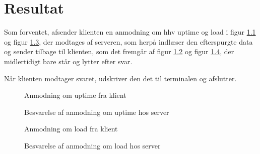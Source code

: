 \chapter{Resultat}

Som forventet, afsender klienten en anmodning om hhv uptime og load i figur \ref{fig:uptimeclient} og figur \ref{fig:loadclient}, der modtages af serveren, som herpå indlæser den efterspurgte data og sender tilbage til klienten, som det fremgår af figur \ref{fig:uptimeserver} og figur \ref{fig:loadserver}, der midlertidigt bare står og lytter efter svar.

Når klienten modtager svaret, udskriver den det til terminalen og afslutter. 

\begin{figure}[h!]
	\centering
	\caption{Anmodning om uptime fra klient}
	\label{fig:uptimeclient}
\end{figure} 
\begin{figure}[h!]
	\centering
	\caption{Besvarelse af anmodning om uptime hos server}
	\label{fig:uptimeserver}
\end{figure} 
\begin{figure}[h!]
	\centering
	\caption{Anmodning om load fra klient}
	\label{fig:loadclient}
\end{figure} 
\begin{figure}[h!]
	\centering
	\caption{Besvarelse af anmodning om load hos server}
	\label{fig:loadserver}
\end{figure} 